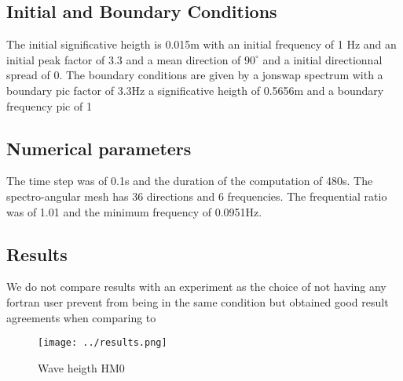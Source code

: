 %
%
\subsection{Initial and Boundary Conditions}
%
    The initial  significative heigth is 0.015m with an initial frequency of 1 Hz and an initial peak factor of 3.3 and a mean direction of $90^{\circ}$ and a initial directionnal spread of 0.
The boundary conditions are given by a jonswap spectrum with a boundary pic factor of 3.3Hz a significative heigth of 0.5656m and a boundary frequency pic of 1

%
%
\subsection{Numerical parameters}
%
The time step was of 0.1s and the duration of the computation of 480s. The spectro-angular mesh has 36 directions and 6 frequencies. The frequential ratio was of 1.01 and the minimum frequency of 0.0951Hz.

\subsection{Results}
We do not compare results with an experiment as the choice of not having any fortran user prevent from being in the same condition but \cite{Bacchi2014} obtained good result agreements when comparing to \cite{Mendez2004}
\begin{figure} [!h]
\centering
\texttt{[image: ../results.png]}
 \caption{Wave heigth HM0}
\label{resVeget}
\end{figure}
